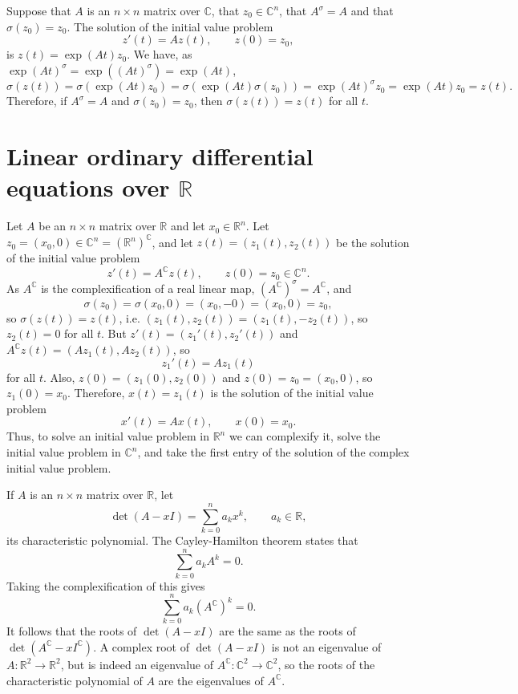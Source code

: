 \documentclass{article}
\begin{document}
Suppose that $A$ is an $n \times n$ matrix over $\mathbb{C}$, that $z_0 \in \mathbb{C}^n$, that
$A^\sigma=A$ and that $\sigma(z_0)=z_0$. The solution of the initial value problem 
\[
z'(t)=Az(t), \qquad z(0)=z_0,
\]
is $z(t)=\exp(At)z_0$. We have, as $\exp(At)^\sigma=\exp((At)^\sigma)=\exp(At)$,
\[
\sigma(z(t))=\sigma(\exp(At)z_0)=\sigma(\exp(At)\sigma(z_0))=\exp(At)^\sigma z_0=\exp(At)z_0=z(t).
\]
Therefore, if $A^\sigma=A$ and $\sigma(z_0)=z_0$, then $\sigma(z(t))=z(t)$ for all $t$.

\section{Linear ordinary differential equations over $\mathbb{R}$}
Let $A$ be an $n \times n$ matrix over $\mathbb{R}$ and let $x_0 \in \mathbb{R}^n$. Let $z_0=(x_0,0) \in \mathbb{C}^n=(\mathbb{R}^n)^\mathbb{C}$, and let
$z(t)=(z_1(t),z_2(t))$ be the solution of the initial value problem
\[
z'(t)=A^\mathbb{C} z(t), \qquad z(0)=z_0 \in \mathbb{C}^n.
\]
As $A^\mathbb{C}$ is the complexification of a real linear map, $(A^\mathbb{C})^\sigma=A^\mathbb{C}$, and
\[
\sigma(z_0)=\sigma(x_0,0)=(x_0,-0)=(x_0,0)=z_0,
\]
so $\sigma(z(t))=z(t)$, i.e. $(z_1(t),z_2(t))=(z_1(t),-z_2(t))$, so $z_2(t)=0$ for all $t$.
But $z'(t)=(z_1'(t),z_2'(t))$ and $A^\mathbb{C} z(t)=(Az_1(t),Az_2(t))$,
so
\[
z_1'(t)=Az_1(t)
\]
for all $t$. Also, $z(0)=(z_1(0),z_2(0))$ and $z(0)=z_0=(x_0,0)$, so $z_1(0)=x_0$. Therefore, $x(t)=z_1(t)$ is the solution
of the initial value problem
\[
x'(t)=Ax(t), \qquad x(0)=x_0.
\]
Thus, to solve an initial value problem in $\mathbb{R}^n$ we can complexify it, solve the initial value problem in $\mathbb{C}^n$, and take
the first entry of the solution of the complex initial value problem.

If $A$ is an $n \times n$ matrix over $\mathbb{R}$, let 
\[
\det(A-xI)=\sum_{k=0}^n a_k x^k, \qquad a_k \in \mathbb{R},
\]
its characteristic polynomial. The Cayley-Hamilton theorem states that
\[
\sum_{k=0}^n a_k A^k=0.
\]
Taking the complexification of this gives
\[
\sum_{k=0}^n a_k (A^\mathbb{C})^k=0.
\]
It follows that the roots of $\det(A-xI)$ are the same as the roots of $\det(A^\mathbb{C}-xI^\mathbb{C})$. A complex root 
of $\det(A-xI)$ is not an eigenvalue of $A:\mathbb{R}^2 \to \mathbb{R}^2$, but is indeed an eigenvalue of $A^\mathbb{C}:\mathbb{C}^2
\to \mathbb{C}^2$, so the roots of the characteristic polynomial
of $A$ are the eigenvalues of $A^\mathbb{C}$.
\end{document}
